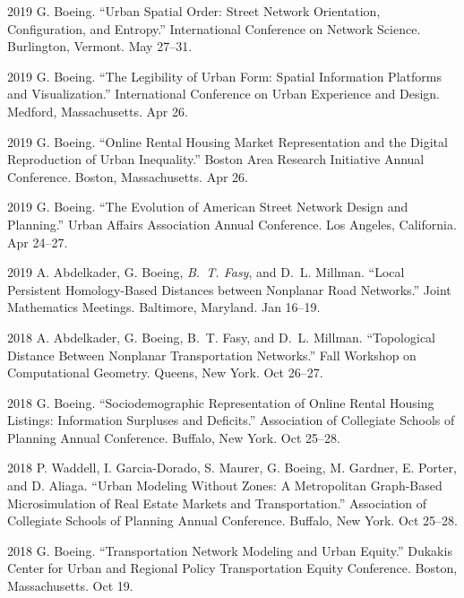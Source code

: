 \documentclass[11pt,letterpaper]{report}
\begin{document}
\begin{tablist}
        \item[2019] \tab{}G. Boeing. \enquote{Urban Spatial Order: Street Network Orientation, Configuration, and Entropy.} International Conference on Network Science. Burlington, Vermont. May 27--31.

        \item[2019] \tab{}G. Boeing. \enquote{The Legibility of Urban Form: Spatial Information Platforms and Visualization.} International Conference on Urban Experience and Design. Medford, Massachusetts. Apr 26.

        \item[2019] \tab{}G. Boeing. \enquote{Online Rental Housing Market Representation and the Digital Reproduction of Urban Inequality.} Boston Area Research Initiative Annual Conference. Boston, Massachusetts. Apr 26.

        \item[2019] \tab{}G. Boeing. \enquote{The Evolution of American Street Network Design and Planning.} Urban Affairs Association Annual Conference. Los Angeles, California. Apr 24--27.

        \item[2019] \tab{}A. Abdelkader, G. Boeing, \textit{B.~T. Fasy}, and D.~L. Millman. \enquote{Local Persistent Homology-Based Distances between Nonplanar Road Networks.} Joint Mathematics Meetings. Baltimore, Maryland. Jan 16--19.

        \item[2018] \tab{}A. Abdelkader, G. Boeing, B.~T. Fasy, and D.~L. Millman. \enquote{Topological Distance Between Nonplanar Transportation Networks.} Fall Workshop on Computational Geometry. Queens, New York. Oct 26--27.

        \item[2018] \tab{}G. Boeing. \enquote{Sociodemographic Representation of Online Rental Housing Listings: Information Surpluses and Deficits.} Association of Collegiate Schools of Planning Annual Conference. Buffalo, New York. Oct 25--28.

        \item[2018] \tab{}P. Waddell, I. Garcia-Dorado, S. Maurer, G. Boeing, M. Gardner, E. Porter, and D. Aliaga. \enquote{Urban Modeling Without Zones: A Metropolitan Graph-Based Microsimulation of Real Estate Markets and Transportation.} Association of Collegiate Schools of Planning Annual Conference. Buffalo, New York. Oct 25--28.

        \item[2018] \tab{}G. Boeing. \enquote{Transportation Network Modeling and Urban Equity.} Dukakis Center for Urban and Regional Policy Transportation Equity Conference. Boston, Massachusetts. Oct 19.


\end{tablist}
\end{document}
